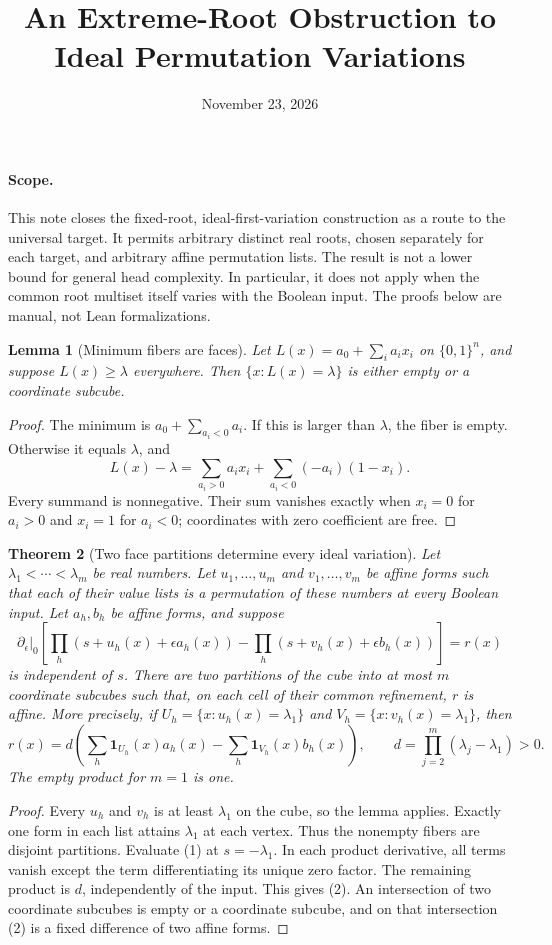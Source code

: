\documentclass[11pt]{article}
\title{An Extreme-Root Obstruction to Ideal Permutation Variations}
\author{}
\date{November 23, 2026}
\newtheorem{theorem}{Theorem}
\newtheorem{lemma}[theorem]{Lemma}
\begin{document}
\maketitle

\paragraph{Scope.}
This note closes the fixed-root, ideal-first-variation construction as
a route to the universal target. It permits arbitrary distinct real
roots, chosen separately for each target, and arbitrary affine
permutation lists. The result is not a lower bound for general head
complexity. In particular, it does not apply when the common root
multiset itself varies with the Boolean input. The proofs below are
manual, not Lean formalizations.

\begin{lemma}[Minimum fibers are faces]
Let $L(x)=a_0+\sum_i a_i x_i$ on $\{0,1\}^n$, and suppose
$L(x)\ge\lambda$ everywhere. Then $\{x:L(x)=\lambda\}$ is
either empty or a coordinate subcube.
\end{lemma}
\begin{proof}
The minimum is $a_0+\sum_{a_i<0}a_i$. If this is larger than
$\lambda$, the fiber is empty. Otherwise it equals $\lambda$, and
\[
 L(x)-\lambda=\sum_{a_i>0}a_i x_i+
                    \sum_{a_i<0}(-a_i)(1-x_i).
\]
Every summand is nonnegative. Their sum vanishes exactly when
$x_i=0$ for $a_i>0$ and $x_i=1$ for $a_i<0$; coordinates with
zero coefficient are free.
\end{proof}

\begin{theorem}[Two face partitions determine every ideal variation]
Let $\lambda_1<\cdots<\lambda_m$ be real numbers. Let
$u_1,\ldots,u_m$ and $v_1,\ldots,v_m$ be affine forms such that
each of their value lists is a permutation of these numbers at every
Boolean input. Let $a_h,b_h$ be affine forms, and suppose
\[
 \left.\partial_\epsilon\right|_0
 \left[\prod_h(s+u_h(x)+\epsilon a_h(x))-
       \prod_h(s+v_h(x)+\epsilon b_h(x))\right]=r(x)
\tag{1}
\]
is independent of $s$. There are two partitions of the cube into
at most $m$ coordinate subcubes such that, on each cell of their
common refinement, $r$ is affine. More precisely, if
$U_h=\{x:u_h(x)=\lambda_1\}$ and
$V_h=\{x:v_h(x)=\lambda_1\}$, then
\[
 r(x)=d\left(\sum_h\mathbf1_{U_h}(x)a_h(x)
                   -\sum_h\mathbf1_{V_h}(x)b_h(x)\right),
 \qquad d=\prod_{j=2}^m(\lambda_j-\lambda_1)>0.
\tag{2}
\]
The empty product for $m=1$ is one.
\end{theorem}
\begin{proof}
Every $u_h$ and $v_h$ is at least $\lambda_1$ on the cube, so
the lemma applies. Exactly one form in each list attains
$\lambda_1$ at each vertex. Thus the nonempty fibers are disjoint
partitions. Evaluate (1) at $s=-\lambda_1$. In each product
derivative, all terms vanish except the term differentiating its
unique zero factor. The remaining product is $d$, independently of
the input. This gives (2). An intersection of two coordinate subcubes
is empty or a coordinate subcube, and on that intersection (2) is a
fixed difference of two affine forms.
\end{proof}
\end{document}
